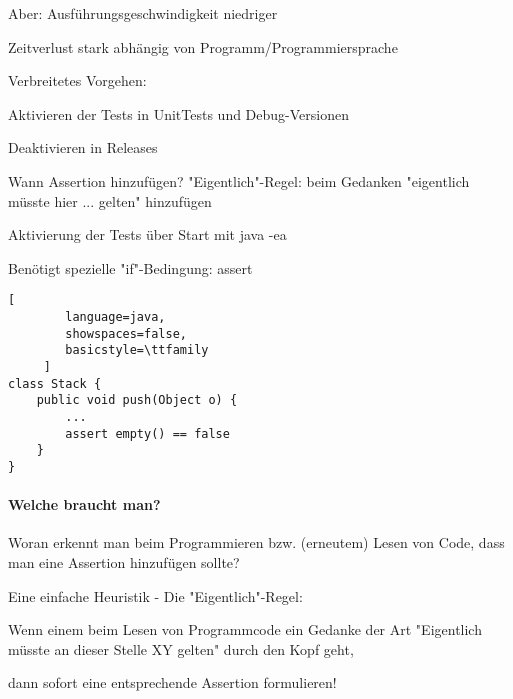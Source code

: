 \documentclass[10pt]{article}
\begin{document}
Aber: Ausführungsgeschwindigkeit niedriger
\begin{itemize*}
\item Zeitverlust stark abhängig von Programm/Programmiersprache
\item Verbreitetes Vorgehen:
\begin{itemize*}
  \item Aktivieren der Tests in UnitTests und Debug-Versionen
  \item Deaktivieren in Releases
\end{itemize*}
\item Wann Assertion hinzufügen? "Eigentlich"-Regel: beim Gedanken "eigentlich müsste hier ... gelten" hinzufügen
\item Aktivierung der Tests über Start mit java -ea
\item Benötigt spezielle "if"-Bedingung: assert
\begin{lstlisting}[
        language=java,
        showspaces=false,
        basicstyle=\ttfamily
     ]
class Stack {
    public void push(Object o) {
        ...
        assert empty() == false
    }
}
\end{lstlisting}


\paragraph{Welche braucht man?}
\begin{itemize*}
  \item Woran erkennt man beim Programmieren bzw. (erneutem) Lesen von Code, dass man eine Assertion hinzufügen sollte?
  \item Eine einfache Heuristik - Die "Eigentlich"-Regel:
  \begin{itemize*}
    \item Wenn einem beim Lesen von Programmcode ein Gedanke der Art "Eigentlich müsste an dieser Stelle XY gelten" durch den Kopf geht,
    \item dann sofort eine entsprechende Assertion formulieren!
  \end{itemize*}
\end{itemize*}


\end{itemize*}
\end{document}

